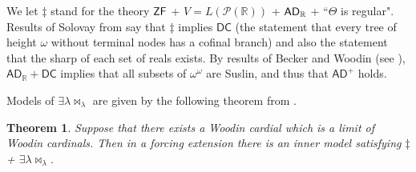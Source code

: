 \documentclass[12pt]{article}
\newtheorem{theorem}{Theorem}[section]
\newtheorem{remark}[theorem]{Remark}
\newcommand{\bR}{{\mathbb{R}}}
\newcommand{\powerset}{\mathcal{P}}
\newcommand{\AD}{\mathsf{AD}}
\newcommand{\ADR}{\mathsf{AD}_{\mathbb{R}}}
\newcommand{\DCR}{\mathsf{DC}_{\mathbb{R}}}
\newcommand{\breals}{\omega^{\omega}}
\newcommand{\HOD}{\mathrm{HOD}}
\newcommand{\DC}{\mathsf{DC}}
\newcommand{\ZF}{\mathsf{ZF}}
\begin{document}

We let $\ddagger$ stand for the theory $\sf{ZF}$ + $V=L(\powerset(\bR))$ + $\sf{AD}_{\mathbb{R}}$ + ``$\Theta$ is regular".
Results of Solovay from \cite{Solovay} say that $\ddagger$ implies $\DC$ (the statement that every tree of height $\omega$ without terminal nodes has a cofinal branch) and also the statement that the sharp of each set of reals exists. By
results of Becker and Woodin (see \cite{LarsonAD}), $\ADR + \DC$ implies that all subsets of $\breals$ are Suslin, and thus that $\AD^{+}$ holds.







Models of $\exists \lambda \Join_{\lambda}$ are given by the following theorem from \cite{Changmodels_1}.

\begin{theorem}\label{inputthrm}
  Suppose that there exists a Woodin cardial which is a limit of Woodin cardinals. Then in a forcing extension there is an inner model satisfying $\ddagger$  + $\exists \lambda \Join_{\lambda}$.
\end{theorem}
\end{document}
